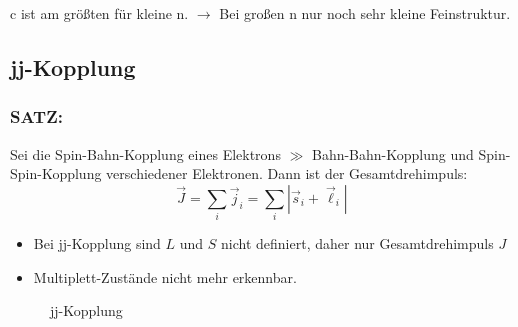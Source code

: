 \documentclass[Ex4_Zusammenfassung.tex]{subfiles}
\begin{document}
c ist am größten für kleine n. $\rightarrow$ Bei großen n nur noch sehr kleine Feinstruktur.
\newpage
\subsection*{jj-Kopplung}

\subsubsection*{SATZ:}
Sei die Spin-Bahn-Kopplung eines Elektrons $\gg$ Bahn-Bahn-Kopplung und Spin-Spin-Kopplung verschiedener Elektronen. Dann ist der Gesamtdrehimpuls:
$$ \vec{J} = \sum_i \vec{j}_i = \sum_i \left| \vec{s}_i + \vec{\ell}_i \right|$$

\begin{itemize}
	\item Bei jj-Kopplung sind $L$ und $S$ nicht definiert, daher nur Gesamtdrehimpuls $J$
	\item Multiplett-Zustände nicht mehr erkennbar.
\end{itemize}

\begin{figure}[!h]
	\centering
	\caption{jj-Kopplung}
\end{figure}
\end{document}
